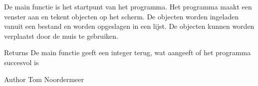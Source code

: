 De main functie is het startpunt van het programma. Het programma maakt een venster aan en tekent objecten op het scherm. De objecten worden ingeladen vanuit een bestand en worden opgeslagen in een lijst. De objecten kunnen worden verplaatst door de muis te gebruiken.

\begin{DoxyReturn}{Returns}
De main functie geeft een integer terug, wat aangeeft of het programma succesvol is
\end{DoxyReturn}
\begin{DoxyAuthor}{Author}
Tom Noordermeer 
\end{DoxyAuthor}
